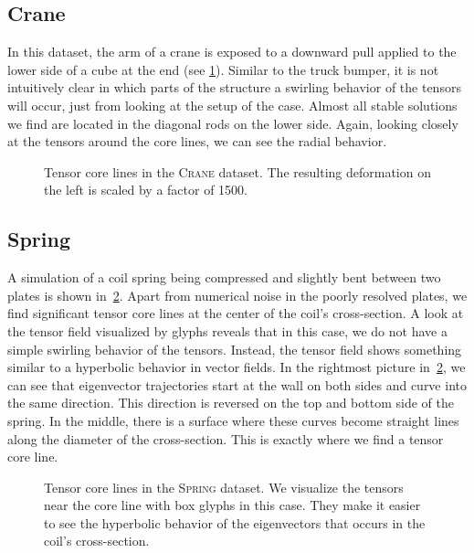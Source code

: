 \subsection{Crane} %
\label{sub:crane}
%
In this dataset, the arm of a crane is exposed to a downward pull applied to
the lower side of a cube at the end (see \cref{fig:crane}).
%
Similar to the truck bumper, it is not intuitively clear in which parts of the
structure a swirling behavior of the tensors will occur, just from looking at
the setup of the case.
%
Almost all stable solutions we find are located in the diagonal rods on the
lower side.
%
Again, looking closely at the tensors around the core lines, we can see the
radial behavior.
%
\begin{figure}[p]
    \centering
    \setlength\figurewidth\linewidth
    
    \caption{Tensor core lines in the \textsc{Crane} dataset. The resulting
             deformation on the left is scaled by a factor of
             \num{1500}.}
    \label{fig:crane}
\end{figure}
%
%
\subsection{Spring} %
\label{sub:spring}
%
A simulation of a coil spring being compressed and slightly bent between two
plates is shown in~\cref{fig:spring}.
%
Apart from numerical noise in the poorly resolved plates, we find significant
tensor core lines at the center of the coil's cross-section.
%
A look at the tensor field visualized by glyphs reveals that in this case, we
do not have a simple swirling behavior of the tensors.
%
Instead, the tensor field shows something similar to a hyperbolic behavior in
vector fields.
%
In the rightmost picture in~\cref{fig:spring}, we can see that eigenvector
trajectories start at the wall on both sides and curve into the same direction.
%
This direction is reversed on the top and bottom side of the spring.
%
In the middle, there is a surface where these curves become straight lines along
the diameter of the cross-section.
%
This is exactly where we find a tensor core line.
%
\begin{figure}[p]
    \centering
    \setlength\figurewidth\linewidth
    
    \caption{Tensor core lines in the \textsc{Spring} dataset. We visualize the
             tensors near the core line with box glyphs in this case. They make
             it easier to see the hyperbolic behavior of the eigenvectors that
             occurs in the coil's cross-section. }
    \label{fig:spring}
\end{figure}
%
%
